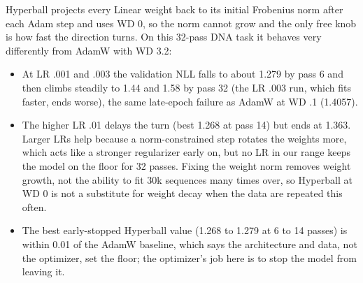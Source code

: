  Hyperball projects every Linear weight back to its initial Frobenius norm after each Adam step and uses WD 0, so the norm cannot grow and the only free knob is how fast the direction turns. On this 32-pass DNA task it behaves very differently from AdamW with WD 3.2:
\begin{itemize}
\item At LR .001 and .003 the validation NLL falls to about 1.279 by pass 6 and then climbs steadily to 1.44 and 1.58 by pass 32 (the LR .003 run, which fits faster, ends worse), the same late-epoch failure as AdamW at WD .1 (1.4057).
\item The higher LR .01 delays the turn (best 1.268 at pass 14) but ends at 1.363. Larger LRs help because a norm-constrained step rotates the weights more, which acts like a stronger regularizer early on, but no LR in our range keeps the model on the floor for 32 passes. Fixing the weight norm removes weight growth, not the ability to fit 30k sequences many times over, so Hyperball at WD 0 is not a substitute for weight decay when the data are repeated this often.
\item The best early-stopped Hyperball value (1.268 to 1.279 at 6 to 14 passes) is within 0.01 of the AdamW baseline, which says the architecture and data, not the optimizer, set the floor; the optimizer's job here is to stop the model from leaving it.
\end{itemize}
